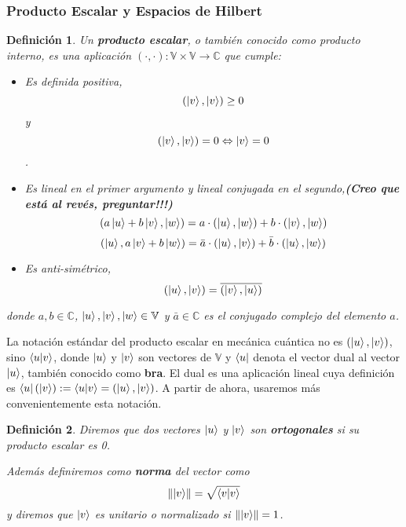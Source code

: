 \documentclass[a4paper]{article}
\newtheorem{deff}{Definición}[section]
\numberwithin{equation}{section}
\newcommand\norm[1]{\lVert#1\rVert}
\begin{document}
\subsubsection{Producto Escalar y Espacios de Hilbert}

\begin{deff}Un \textbf{producto escalar}, o también conocido como producto interno, es una aplicación $(\cdot, \cdot): \mathbb{V}\times\mathbb{V} \longrightarrow \mathbb{C}$ que cumple:
\begin{itemize}

\item Es definida positiva,
\begin{equation}
(\ket{v}, \ket{v}) \geq 0
\end{equation} y
\begin{equation}
(\ket{v}, \ket{v}) = 0 \Leftrightarrow \ket{v} = 0
\end{equation}.

\item Es lineal en el primer argumento y lineal conjugada en el segundo,\textbf{(Creo que está al revés, preguntar!!!)}
\begin{equation}
(a\ket{u} + b\ket{v}, \ket{w}) = a\cdot(\ket{u}, \ket{w}) + b\cdot(\ket{v}, \ket{w})
\end{equation}
\begin{equation}
(\ket{u}, a\ket{v} + b\ket{w}) = \bar{a} \cdot (\ket{u}, \ket{v}) + \bar{b} \cdot (\ket{u}, \ket{w})
\end{equation}

\item Es anti-simétrico,
\begin{equation}
(\ket{u}, \ket{v}) = \overline{(\ket{v}, \ket{u})}
\end{equation}
\end{itemize}
donde $a,b \in \mathbb{C}$, $\ket{u}, \ket{v}, \ket{w} \in \mathbb{V}$ y $\bar{a} \in \mathbb{C}$ es el conjugado complejo del elemento $a$.
\end{deff}
La notación estándar del producto escalar en mecánica cuántica no es $(\ket{u}, \ket{v})$, sino $\braket{u|v}$, donde $\ket{u}$ y $\ket{v}$ son vectores de $\mathbb{V}$ y $\bra{u}$ denota el vector dual al vector $\ket{u}$, también conocido como \textbf{bra}. El dual es una aplicación lineal cuya definición es $\bra{u}(\ket{v}) := \braket{u|v} = (\ket{u},\ket{v})$. A partir de ahora, usaremos más convenientemente esta notación.

\begin{deff}Diremos que dos vectores $\ket{u}$ y $\ket{v}$ son \textbf{ortogonales} si su producto escalar es 0.

Además definiremos como \textbf{norma} del vector como 
\begin{equation}
\norm{\ket{v}} = \sqrt{\braket{v|v}}
\end{equation}
y diremos que $\ket{v}$ es unitario o normalizado si $\norm{\ket{v}} = 1$.
\end{deff}
\end{document}
